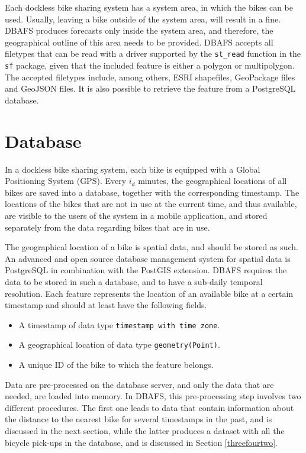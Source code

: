 \documentclass[12pt,oneside]{reedthesis}
\providecommand{\tightlist}{%
  \setlength{\itemsep}{0pt}\setlength{\parskip}{0pt}}
\begin{document}
Each dockless bike sharing system has a system area, in which the bikes
can be used. Usually, leaving a bike outside of the system area, will
result in a fine. DBAFS produces forecasts only inside the system area,
and therefore, the geographical outline of this area needs to be
provided. DBAFS accepts all filetypes that can be read with a driver
supported by the \texttt{st\_read} function in the \texttt{sf} package,
given that the included feature is either a polygon or multipolygon. The
accepted filetypes include, among others, ESRI shapefiles, GeoPackage
files and GeoJSON files. It is also possible to retrieve the feature
from a PostgreSQL database.

\section{Database}\label{threefour}

In a dockless bike sharing system, each bike is equipped with a Global
Positioning System (GPS). Every \(i_{d}\) minutes, the geographical
locations of all bikes are saved into a database, together with the
corresponding timestamp. The locations of the bikes that are not in use
at the current time, and thus available, are visible to the users of the
system in a mobile application, and stored separately from the data
regarding bikes that are in use.

The geographical location of a bike is spatial data, and should be
stored as such. An advanced and open source database management system
for spatial data is PostgreSQL in combination with the PostGIS
extension. DBAFS requires the data to be stored in such a database, and
to have a sub-daily temporal resolution. Each feature represents the
location of an available bike at a certain timestamp and should at least
have the following fields.
\begin{itemize}
\tightlist
\item
  A timestamp of data type \texttt{timestamp\ with\ time\ zone}.
\item
  A geographical location of data type \texttt{geometry(Point)}.
\item
  A unique ID of the bike to which the feature belongs.
\end{itemize}
Data are pre-processed on the database server, and only the data that
are needed, are loaded into memory. In DBAFS, this pre-processing step
involves two different procedures. The first one leads to data that
contain information about the distance to the nearest bike for several
timestamps in the past, and is discussed in the next section, while the
latter produces a dataset with all the bicycle pick-ups in the database,
and is discussed in Section \ref{threefourtwo}.
\end{document}
